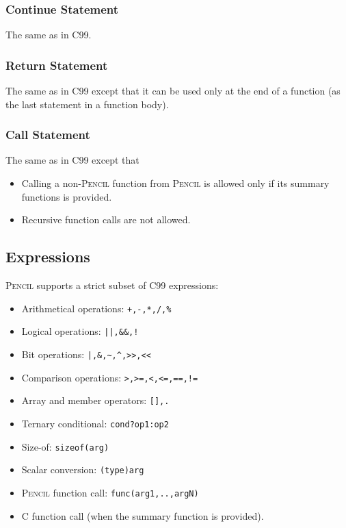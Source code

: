 \documentclass{carp}
\newcommand\pencil{\textsc{Pencil}\xspace}
\newcommand{\C}{C99\xspace}
\begin{document}
\subsubsection{Continue Statement}
The same as in \C.
\subsubsection{Return Statement}
The same as in \C except that it can be used only at the end of a function
(\ie as the last statement in a function body).
\subsubsection{Call Statement}
The same as in \C except that
\begin{itemize}
 \item Calling a non-\pencil function from \pencil
 is allowed only if its summary functions is provided.
 \item Recursive function calls are not allowed.
\end{itemize}

\subsection{Expressions}
\pencil supports a strict subset of \C expressions:
\begin{itemize}
  \item Arithmetical operations: \lstinline!+,-,*,/,%!
  \item Logical operations: \lstinline{||,&&,!}
  \item Bit operations: \lstinline{|,&,~,^,>>,<<}
  \item Comparison operations: \lstinline{>,>=,<,<=,==,!=}
  \item Array and member operators: \lstinline{[],.}
  \item Ternary conditional: \lstinline!cond?op1:op2!
  \item Size-of: \lstinline!sizeof(arg)!
  \item Scalar conversion: \lstinline!(type)arg!
  \item \pencil function call: \lstinline!func(arg1,..,argN)!
  \item C function call (when the summary function is provided).
\end{itemize}
\end{document}
